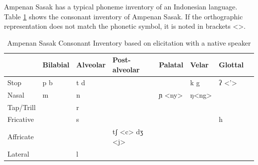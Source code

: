 \documentclass[12pt]{ouparticle}
\begin{document}
Ampenan Sasak has a typical phoneme inventory of an Indonesian language. Table \ref{tab:sasak_consonants} shows the consonant inventory of Ampenan Sasak. If the orthographic representation does not match the phonetic symbol, it is noted in brackets <>. 

\begin{table}[ht]
\centering
\caption{Ampenan Sasak Consonant Inventory based on elicitation with a native speaker}
\label{tab:sasak_consonants}
\begin{tabular}{l | l l l l l l l}
	& Bilabial  & Alveolar & Post-alveolar & Palatal & Velar & Glottal  \\
\hline
Stop & p b & t d & & & k g & ʔ <’> \\
Nasal & m & n & & ɲ <ny> & ŋ<ng> &\\
Tap/Trill & & r & & & & & \\
Fricative & & s & & & & h \\
Affricate & & & tʃ <c> dʒ <j> & & & \\
Lateral & & l & & & & & \\
\end{tabular}
\end{table}
\end{document}
